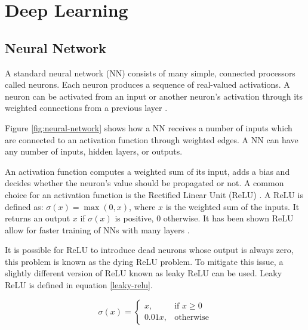 \section{Deep Learning}

\subsection{Neural Network}

A standard neural network (NN) consists of many simple, connected processors called neurons. Each neuron produces a sequence of real-valued activations. A neuron can be activated from an input or another neuron's activation through its weighted connections from a previous layer \cite{NeuralNetwork}.

Figure \ref{fig:neural-network} shows how a NN receives a number of inputs which are connected to an activation function through weighted edges. A NN can have any number of inputs, hidden layers, or outputs.


An activation function computes a weighted sum of its input, adds a bias and decides whether the neuron's value should be propagated or not. A common choice for an activation function is the Rectified Linear Unit (ReLU) \cite{Relu}. A ReLU is defined as: $\sigma(x) = \max(0, x)$, where $x$ is the weighted sum of the inputs. It returns an output $x$ if $\sigma(x)$ is positive, $0$ otherwise. It has been shown ReLU allow for faster training of NNs with many layers \cite{cnn-star-galaxy}.


It is possible for ReLU to introduce dead neurons whose output is always zero, this problem is known as the dying ReLU problem. To mitigate this issue, a slightly different version of ReLU known as leaky ReLU can be used. Leaky ReLU is defined in equation \ref{leaky-relu}.

\begin{equation}
\sigma(x) =
\begin{cases} \label{leaky-relu}
    x      , & \text{if } x\geq 0\\
    0.01x , & \text{otherwise}
\end{cases}
\end{equation}

